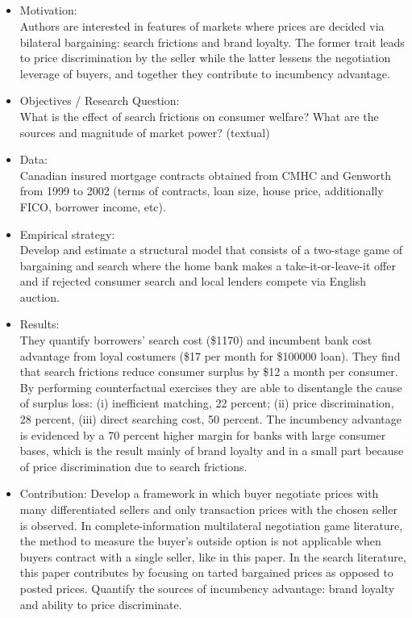 \documentclass{article}
\theoremstyle{definition}
\begin{document}
\subsection*{\cite{allen2019search}}

\begin{itemize}
    \item Motivation: \\ Authors are interested in features of markets where prices are decided via bilateral bargaining: search frictions and brand loyalty. The former trait leads to price discrimination by the seller while the latter lessens the negotiation leverage of buyers, and together they contribute to incumbency advantage. 
    
    \item Objectives / Research Question:\\ What is the effect of search frictions on consumer welfare? What are the sources and magnitude of market power? (textual)
    
    \item Data: \\Canadian insured mortgage contracts obtained from CMHC and Genworth from 1999 to 2002 (terms of contracts, loan size, house price, additionally FICO, borrower income, etc). 
    
    \item Empirical strategy: \\Develop and estimate a structural model that consists of a two-stage game of bargaining and search where the home bank makes a take-it-or-leave-it offer and if rejected consumer search and local lenders compete via English auction. 

    
    \item Results: \\ They quantify borrowers' search cost (\$1170) and incumbent bank cost advantage from loyal costumers (\$17 per month for \$100000 loan). They find that search frictions reduce consumer surplus by \$12 a month per consumer. By performing counterfactual exercises they are able to disentangle the cause of surplus loss: (i) inefficient matching, 22 percent; (ii) price discrimination, 28 percent, (iii) direct searching cost, 50 percent. The incumbency advantage is evidenced by a 70 percent higher margin for banks with large consumer bases, which is the result mainly of brand loyalty and in a small part because of price discrimination due to search frictions.
    
    \item Contribution: Develop a framework in which buyer negotiate prices with many differentiated sellers and only transaction prices with the chosen seller is observed. In complete-information multilateral negotiation game literature, the method to measure the buyer's outside option is not applicable when buyers contract with a single seller, like in this paper. In the search literature, this paper contributes by focusing on tarted bargained prices as opposed to posted prices. Quantify the sources of incumbency advantage: brand loyalty and ability to price discriminate. 
    

\end{itemize}
\end{document}
